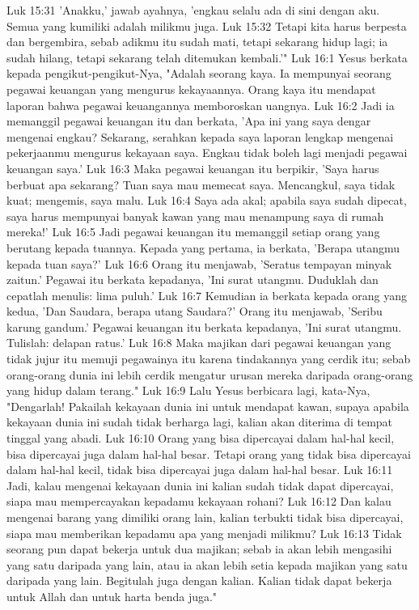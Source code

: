 Luk 15:31  'Anakku,' jawab ayahnya, 'engkau selalu ada di sini dengan aku. Semua yang kumiliki adalah milikmu juga.
Luk 15:32  Tetapi kita harus berpesta dan bergembira, sebab adikmu itu sudah mati, tetapi sekarang hidup lagi; ia sudah hilang, tetapi sekarang telah ditemukan kembali.'"
Luk 16:1  Yesus berkata kepada pengikut-pengikut-Nya, "Adalah seorang kaya. Ia mempunyai seorang pegawai keuangan yang mengurus kekayaannya. Orang kaya itu mendapat laporan bahwa pegawai keuangannya memboroskan uangnya.
Luk 16:2  Jadi ia memanggil pegawai keuangan itu dan berkata, 'Apa ini yang saya dengar mengenai engkau? Sekarang, serahkan kepada saya laporan lengkap mengenai pekerjaanmu mengurus kekayaan saya. Engkau tidak boleh lagi menjadi pegawai keuangan saya.'
Luk 16:3  Maka pegawai keuangan itu berpikir, 'Saya harus berbuat apa sekarang? Tuan saya mau memecat saya. Mencangkul, saya tidak kuat; mengemis, saya malu.
Luk 16:4  Saya ada akal; apabila saya sudah dipecat, saya harus mempunyai banyak kawan yang mau menampung saya di rumah mereka!'
Luk 16:5  Jadi pegawai keuangan itu memanggil setiap orang yang berutang kepada tuannya. Kepada yang pertama, ia berkata, 'Berapa utangmu kepada tuan saya?'
Luk 16:6  Orang itu menjawab, 'Seratus tempayan minyak zaitun.' Pegawai itu berkata kepadanya, 'Ini surat utangmu. Duduklah dan cepatlah menulis: lima puluh.'
Luk 16:7  Kemudian ia berkata kepada orang yang kedua, 'Dan Saudara, berapa utang Saudara?' Orang itu menjawab, 'Seribu karung gandum.' Pegawai keuangan itu berkata kepadanya, 'Ini surat utangmu. Tulislah: delapan ratus.'
Luk 16:8  Maka majikan dari pegawai keuangan yang tidak jujur itu memuji pegawainya itu karena tindakannya yang cerdik itu; sebab orang-orang dunia ini lebih cerdik mengatur urusan mereka daripada orang-orang yang hidup dalam terang."
Luk 16:9  Lalu Yesus berbicara lagi, kata-Nya, "Dengarlah! Pakailah kekayaan dunia ini untuk mendapat kawan, supaya apabila kekayaan dunia ini sudah tidak berharga lagi, kalian akan diterima di tempat tinggal yang abadi.
Luk 16:10  Orang yang bisa dipercayai dalam hal-hal kecil, bisa dipercayai juga dalam hal-hal besar. Tetapi orang yang tidak bisa dipercayai dalam hal-hal kecil, tidak bisa dipercayai juga dalam hal-hal besar.
Luk 16:11  Jadi, kalau mengenai kekayaan dunia ini kalian sudah tidak dapat dipercayai, siapa mau mempercayakan kepadamu kekayaan rohani?
Luk 16:12  Dan kalau mengenai barang yang dimiliki orang lain, kalian terbukti tidak bisa dipercayai, siapa mau memberikan kepadamu apa yang menjadi milikmu?
Luk 16:13  Tidak seorang pun dapat bekerja untuk dua majikan; sebab ia akan lebih mengasihi yang satu daripada yang lain, atau ia akan lebih setia kepada majikan yang satu daripada yang lain. Begitulah juga dengan kalian. Kalian tidak dapat bekerja untuk Allah dan untuk harta benda juga."
